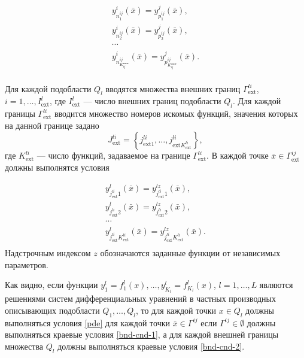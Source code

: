 \documentclass[a4paper,12pt]{article}
\begin{document}
\begin{equation}
    \begin{array}{ll}
        y^i_{n^{ij}_1}(\bar{x})=y^j_{p^{ij}_1}(\bar{x}),\\
        y^i_{n^{ij}_2}(\bar{x})=y^j_{p^{ij}_2}(\bar{x}),\\
        \cdots \\
        y^i_{n^{ij}_{K^{соот}_{ij}}}(\bar{x})=
        y^j_{p^{ij}_{K^{соот}_{ij}}}(\bar{x}).\\
    \end{array}
    \label{bnd-cnd-1}
\end{equation}

Для каждой подобласти $Q_l$ вводятся множества внешних границ 
$\Gamma^{li}_{\text{ext}}$, $i=1,\ldots,I^{l}_{\text{ext}}$, где $I^l_{\text{ext}}$ --- число
внешних границ подобласти $Q_l$. Для каждой границы $\Gamma^{li}_{\text{ext}}$ 
вводится множество номеров искомых функций, значения которых на данной
границе задано $$J^{li}_{\text{ext}}=\left\{j^{li}_{\text{ext} 1},\ldots,
j^{li}_{\text{ext} K^{li}_{\text{ext}}}\right\},$$ где $K^{li}_{\text{ext}}$ --- число 
функций, задаваемое на границе $\Gamma^{li}_{\text{ext}}$. В каждой точке
$\bar{x} \in \Gamma^{ij}_{\text{ext}}$ должны выполнятся условия

\begin{equation}
    \begin{array}{ll}
        y^l_{j^{li}_{\text{ext} }1}(\bar{x})=
          y^{lz}_{j^{li}_{\text{ext} }1}(\bar{x}),\\
        y^l_{j^{li}_{\text{ext} }2}(\bar{x})=
          y^{lz}_{j^{li}_{\text{ext} }2}(\bar{x}),\\
        \cdots \\
        y^l_{j^{li}_{\text{ext}} K^{li}_{\text{ext}}}(\bar{x})=
        y^{lz}_{j^{li}_{\text{ext}} K^{li}_{\text{ext}}}(\bar{x}).\\
    \end{array}
    \label{bnd-cnd-2}
\end{equation}
Надстрочным индексом $z$ обозначаются заданные функции от независимых
параметров.

Как видно, если функции $y^l_1=f^l_1(x),\ldots,y^l_{K_l}=f^l_{K_l}(x)$,
$l=1,\ldots,L$ являются решениями систем дифференциальных уравнений в
частных производных описывающих подобласти $Q_1,\ldots,Q_l$, то для
каждой точки $x \in Q_l$ должны выполняться условия \eqref{pde} для
каждой точки $\bar{x} \in \Gamma^{ij}$ если $\Gamma^{ij} \in \emptyset$
должны выполняться краевые условия \eqref{bnd-cnd-1}, а для каждой 
внешней границы множества $Q_l$ должны выполняться краевые условия
\eqref{bnd-cnd-2}. 
\end{document}
